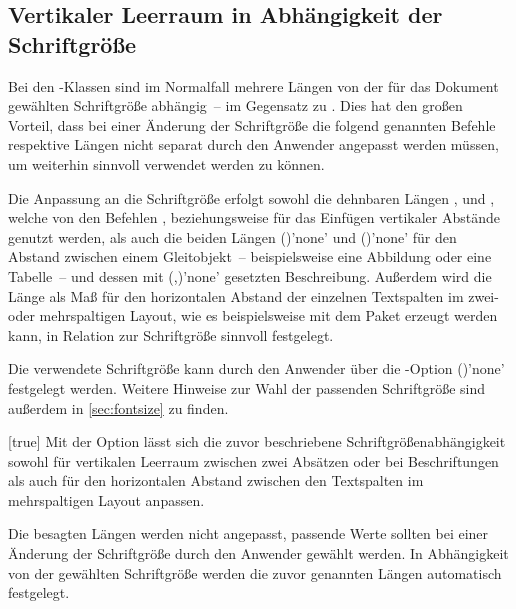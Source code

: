 \begin{Declaration*}{}
\begin{Declaration*}{}
\begin{Declaration*}{}
\subsection{Vertikaler Leerraum in Abhängigkeit der Schriftgröße}
%
%
%
Bei den \TUDScript-Klassen sind im Normalfall mehrere Längen von der für das 
Dokument gewählten Schriftgröße abhängig~-- im Gegensatz zu \KOMAScript. Dies 
hat den großen Vorteil, dass bei einer Änderung der Schriftgröße die folgend 
genannten Befehle respektive Längen nicht separat durch den Anwender angepasst 
werden müssen, um weiterhin sinnvoll verwendet werden zu können.

Die Anpassung an die Schriftgröße erfolgt sowohl die dehnbaren Längen 
,  und , 
welche von den Befehlen ,  beziehungsweise 
 für das Einfügen vertikaler Abstände genutzt werden, als auch 
die beiden Längen ()'none' und 
()'none' für den Abstand zwischen 
einem Gleitobjekt~-- beispielsweise eine Abbildung oder eine Tabelle~-- und 
dessen mit (,)'none' 
gesetzten Beschreibung. Außerdem wird die Länge  als Maß für 
den horizontalen Abstand der einzelnen Textspalten im zwei- oder mehrspaltigen 
Layout, wie es beispielsweise mit dem Paket  erzeugt werden 
kann, in Relation zur Schriftgröße sinnvoll festgelegt.

Die verwendete Schriftgröße kann durch den Anwender über die \KOMAScript-Option 
()'none' festgelegt 
werden.
Weitere Hinweise zur Wahl der passenden Schriftgröße sind außerdem in 
\autoref{sec:fontsize} zu finden.

\begin{Declaration}[v2.05]{}[true]%
\printdeclarationlist%
%
Mit der Option  lässt sich die zuvor beschriebene 
Schriftgrößenabhängigkeit sowohl für vertikalen Leerraum zwischen zwei Absätzen 
oder bei Beschriftungen als auch für den horizontalen Abstand zwischen den 
Textspalten im mehrspaltigen Layout anpassen.
%
\begin{values}{}
  Die besagten Längen werden nicht angepasst, passende Werte sollten bei einer 
  Änderung der Schriftgröße durch den Anwender gewählt werden.
  In Abhängigkeit von der gewählten Schriftgröße werden die zuvor genannten 
  Längen automatisch festgelegt.
\end{values}
\end{Declaration}




\end{Declaration*}
\end{Declaration*}
\end{Declaration*}
